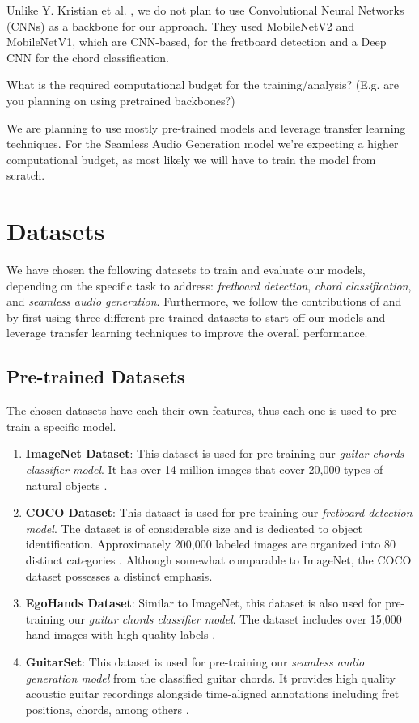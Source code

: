 \documentclass[10pt,twocolumn,letterpaper]{article}
\begin{document}
Unlike Y. Kristian et al. \cite{Kristian_Zaman_Tenoyo_Jodhinata_2024}, we do not plan to use Convolutional Neural Networks (CNNs) as a backbone for our approach. They used MobileNetV2 and MobileNetV1, which are CNN-based, for the fretboard detection and a Deep CNN for the chord classification.

What is the required computational budget for the training/analysis? (E.g. are you planning on using pretrained backbones?)

We are planning to use mostly pre-trained models and leverage transfer learning techniques. For the Seamless Audio Generation model we're expecting a higher computational budget, as most likely we will have to train the model from scratch.

\section{Datasets}\label{sec:datasets}

We have chosen the following datasets to train and evaluate our models, depending on the specific task to address: \emph{fretboard detection}, \emph{chord classification}, and \emph{seamless audio generation}. Furthermore, we follow the contributions of \cite{Kristian_Zaman_Tenoyo_Jodhinata_2024} and \cite{Jadhav_transferlearning} by first using three different pre-trained datasets to start off our models and leverage transfer learning techniques to improve the overall performance.
\subsection{Pre-trained Datasets}
The chosen datasets have each their own features, thus each one is used to pre-train a specific model.

\begin{enumerate}[label=\arabic*), itemsep=0.25pt]
    \item \textbf{ImageNet Dataset}: This dataset is used for pre-training our \emph{guitar chords classifier model}. It has over 14 million images that cover 20,000 types of natural objects \cite{russakovsky2015imagenetlargescalevisual}.
    \item \textbf{COCO Dataset}: This dataset is used for pre-training our \emph{fretboard detection model}. The dataset is of considerable size and is dedicated to object identification. Approximately 200,000 labeled images are organized into 80 distinct categories \cite{lin2015microsoftcococommonobjects}. Although somewhat comparable to ImageNet, the COCO dataset possesses a distinct emphasis.
    \item \textbf{EgoHands Dataset}: Similar to ImageNet, this dataset is also used for pre-training our \emph{guitar chords classifier model}. The dataset includes over 15,000 hand images with high-quality labels \cite{Bambach_2015_ICCV}.
    \item \textbf{GuitarSet}: This dataset is used for pre-training our \emph{seamless audio generation model} from the classified guitar chords. It provides high quality acoustic guitar recordings alongside time-aligned annotations including fret positions, chords, among others \cite{Xi2018}.
\end{enumerate}
\end{document}
